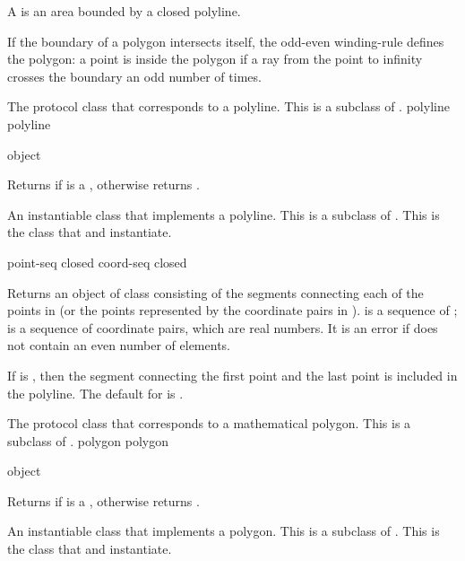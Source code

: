 A  is an area bounded by a closed polyline. 

If the boundary of a polygon intersects itself, the odd-even winding-rule
defines the polygon: a point is inside the polygon if a ray from the point to
infinity crosses the boundary an odd number of times.


The protocol class that corresponds to a polyline.  This is a subclass of
.
 {polyline} {polyline}

 {object}

Returns  if  is a , otherwise returns
.


An instantiable class that implements a polyline.  This is a subclass of
.  This is the class that  and
 instantiate.
\Immutable

  {point-seq \key closed}
 {coord-seq \key closed}

Returns an object of class  consisting of the segments
connecting each of the points in  (or the points represented by
the coordinate pairs in ).   is a sequence of
;  is a sequence of coordinate pairs, which are real
numbers.  It is an error if  does not contain an even number of
elements.

If  is , then the segment connecting the first point and
the last point is included in the polyline.  The default for  is
.

\MayCaptureInputs



The protocol class that corresponds to a mathematical polygon.  This is a
subclass of .
 {polygon} {polygon}

 {object}

Returns  if  is a , otherwise returns
.


An instantiable class that implements a polygon.  This is a subclass of
.  This is the class that  and 
instantiate.
\Immutable

